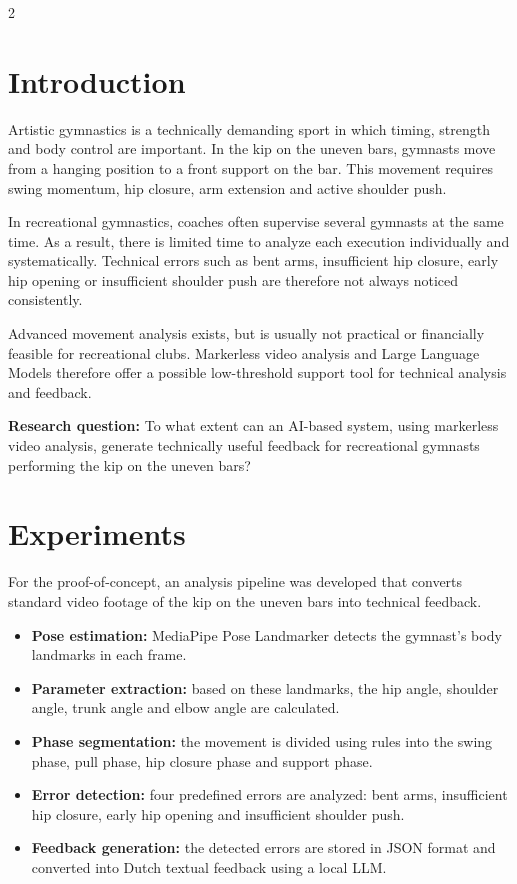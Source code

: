 \documentclass[a0,portrait, english]{hogent-poster}
\begin{document}
    \begin{multicols}{2} %
        
        \section{Introduction}
        
        Artistic gymnastics is a technically demanding sport in which timing, strength and body control are important. In the kip on the uneven bars, gymnasts move from a hanging position to a front support on the bar. This movement requires swing momentum, hip closure, arm extension and active shoulder push.
        
        In recreational gymnastics, coaches often supervise several gymnasts at the same time. As a result, there is limited time to analyze each execution individually and systematically. Technical errors such as bent arms, insufficient hip closure, early hip opening or insufficient shoulder push are therefore not always noticed consistently.
        
        Advanced movement analysis exists, but is usually not practical or financially feasible for recreational clubs. Markerless video analysis and Large Language Models therefore offer a possible low-threshold support tool for technical analysis and feedback.
        
        \textbf{Research question:} To what extent can an AI-based system, using markerless video analysis, generate technically useful feedback for recreational gymnasts performing the kip on the uneven bars?

        \section{Experiments}
        
        For the proof-of-concept, an analysis pipeline was developed that converts standard video footage of the kip on the uneven bars into technical feedback.
        
        \begin{itemize} 
            \item \textbf{Pose estimation:} MediaPipe Pose Landmarker detects the gymnast's body landmarks in each frame.
            \item \textbf{Parameter extraction:} based on these landmarks, the hip angle, shoulder angle, trunk angle and elbow angle are calculated.
            \item \textbf{Phase segmentation:} the movement is divided using rules into the swing phase, pull phase, hip closure phase and support phase.
            \item \textbf{Error detection:} four predefined errors are analyzed: bent arms, insufficient hip closure, early hip opening and insufficient shoulder push.
            \item \textbf{Feedback generation:} the detected errors are stored in JSON format and converted into Dutch textual feedback using a local LLM.
        \end{itemize}
        

\end{multicols}
\end{document}
